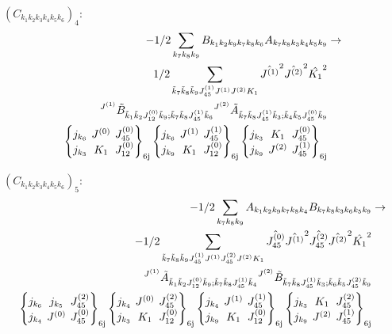 \documentclass[11pt]{article}
\newcommand{\sixj}[6]{\begingroup\setlength{\arraycolsep}{0.2em}\begin{Bmatrix} #1 & #2 & #3 \\ #4 & #5 & #6 \end{Bmatrix}_{\text{6j}}\endgroup}
\begin{document}
$\left({C}_{{k}_{1}{k}_{2}{k}_{3}{k}_{4}{k}_{5}{k}_{6}}\right)_{4}$:
\begin{align}
-1/2\sum_{{k}_{7}{k}_{8}{k}_{9}}{B}_{{k}_{1}{k}_{2}{k}_{9}{k}_{7}{k}_{8}{k}_{6}}{A}_{{k}_{7}{k}_{8}{k}_{3}{k}_{4}{k}_{5}{k}_{9}}&\rightarrow \notag \\1/2\sum_{\tilde{k}_{7}\tilde{k}_{8}\tilde{k}_{9}J^{(1)}_{45}J^{(1)}J^{(2)}K_{1}}\hat{J^{(1)}}^{2}\hat{J^{(2)}}^{2}\hat{K_{1}}^{2}& \notag \\{}^{J^{(1)}}\tilde{B}_{\tilde{k}_{1}\tilde{k}_{2}J^{(0)}_{12}\tilde{k}_{9};\tilde{k}_{7}\tilde{k}_{8}J^{(1)}_{45}\tilde{k}_{6}}{}^{J^{(2)}}\tilde{A}_{\tilde{k}_{7}\tilde{k}_{8}J^{(1)}_{45}\tilde{k}_{3};\tilde{k}_{4}\tilde{k}_{5}J^{(0)}_{45}\tilde{k}_{9}}& \notag \\\sixj{j_{{k}_{6}}}{J^{(0)}}{J^{(0)}_{45}}{j_{{k}_{3}}}{K_{1}}{J^{(0)}_{12}}\sixj{j_{{k}_{6}}}{J^{(1)}}{J^{(1)}_{45}}{j_{{k}_{9}}}{K_{1}}{J^{(0)}_{12}}\sixj{j_{{k}_{3}}}{K_{1}}{J^{(0)}_{45}}{j_{{k}_{9}}}{J^{(2)}}{J^{(1)}_{45}}
\end{align}

$\left({C}_{{k}_{1}{k}_{2}{k}_{3}{k}_{4}{k}_{5}{k}_{6}}\right)_{5}$:
\begin{align}
-1/2\sum_{{k}_{7}{k}_{8}{k}_{9}}{A}_{{k}_{1}{k}_{2}{k}_{9}{k}_{7}{k}_{8}{k}_{4}}{B}_{{k}_{7}{k}_{8}{k}_{3}{k}_{6}{k}_{5}{k}_{9}}&\rightarrow \notag \\-1/2\sum_{\tilde{k}_{7}\tilde{k}_{8}\tilde{k}_{9}J^{(1)}_{45}J^{(1)}J^{(2)}_{45}J^{(2)}K_{1}}\hat{J^{(0)}_{45}}\hat{J^{(1)}}^{2}\hat{J^{(2)}_{45}}\hat{J^{(2)}}^{2}\hat{K_{1}}^{2}& \notag \\{}^{J^{(1)}}\tilde{A}_{\tilde{k}_{1}\tilde{k}_{2}J^{(0)}_{12}\tilde{k}_{9};\tilde{k}_{7}\tilde{k}_{8}J^{(1)}_{45}\tilde{k}_{4}}{}^{J^{(2)}}\tilde{B}_{\tilde{k}_{7}\tilde{k}_{8}J^{(1)}_{45}\tilde{k}_{3};\tilde{k}_{6}\tilde{k}_{5}J^{(2)}_{45}\tilde{k}_{9}}& \notag \\\sixj{j_{{k}_{6}}}{j_{{k}_{5}}}{J^{(2)}_{45}}{j_{{k}_{4}}}{J^{(0)}}{J^{(0)}_{45}}\sixj{j_{{k}_{4}}}{J^{(0)}}{J^{(2)}_{45}}{j_{{k}_{3}}}{K_{1}}{J^{(0)}_{12}}\sixj{j_{{k}_{4}}}{J^{(1)}}{J^{(1)}_{45}}{j_{{k}_{9}}}{K_{1}}{J^{(0)}_{12}}\sixj{j_{{k}_{3}}}{K_{1}}{J^{(2)}_{45}}{j_{{k}_{9}}}{J^{(2)}}{J^{(1)}_{45}}
\end{align}
\end{document}
